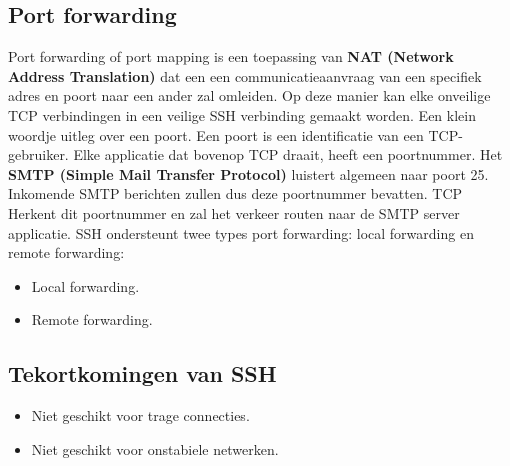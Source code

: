 \documentclass{report}
\begin{document}
	\subsection{Port forwarding}
	Port forwarding of port mapping is een toepassing van \textbf{NAT (Network Address Translation)} dat een een communicatieaanvraag van een specifiek adres en poort naar een ander zal omleiden. Op deze manier kan elke onveilige TCP verbindingen in een veilige SSH verbinding gemaakt worden. Een klein woordje uitleg over een poort. Een poort is een identificatie van een TCP-gebruiker. Elke applicatie dat bovenop TCP draait, heeft een poortnummer. Het \textbf{SMTP (Simple Mail Transfer Protocol)} luistert algemeen naar poort 25. Inkomende SMTP berichten zullen dus deze poortnummer bevatten. TCP Herkent dit poortnummer en zal het verkeer routen naar de SMTP server applicatie. SSH ondersteunt twee types port forwarding: local forwarding en remote forwarding:
	\begin{itemize}
		\item {Local forwarding.}
		\item {Remote forwarding.}
	\end{itemize}

	\subsection{Tekortkomingen van SSH}
	\begin{itemize}
		\item[\alert] Niet geschikt voor trage connecties.
		\item[\alert] Niet geschikt voor onstabiele netwerken. 
	\end{itemize}
\end{document}
